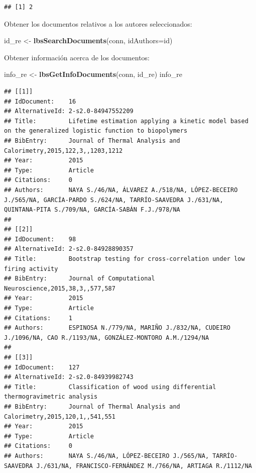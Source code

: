 \documentclass[
]{book}
\newenvironment{Shaded}{\begin{snugshade}}{\end{snugshade}}
\newcommand{\AttributeTok}[1]{\textcolor[rgb]{0.13,0.29,0.53}{#1}}
\newcommand{\FunctionTok}[1]{\textcolor[rgb]{0.13,0.29,0.53}{\textbf{#1}}}
\newcommand{\NormalTok}[1]{#1}
\newcommand{\OtherTok}[1]{\textcolor[rgb]{0.56,0.35,0.01}{#1}}
\begin{document}
\begin{verbatim}
## [1] 2
\end{verbatim}

Obtener los documentos relativos a los autores seleccionados:

\begin{Shaded}
\begin{Highlighting}[]
\NormalTok{id\_re  }\OtherTok{\textless{}{-}}  \FunctionTok{lbsSearchDocuments}\NormalTok{(conn, }\AttributeTok{idAuthors=}\NormalTok{id)}
\end{Highlighting}
\end{Shaded}

Obtener información acerca de los documentos:

\begin{Shaded}
\begin{Highlighting}[]
\NormalTok{info\_re }\OtherTok{\textless{}{-}} \FunctionTok{lbsGetInfoDocuments}\NormalTok{(conn, id\_re)}
\NormalTok{info\_re}
\end{Highlighting}
\end{Shaded}

\begin{verbatim}
## [[1]]
## IdDocument:    16
## AlternativeId: 2-s2.0-84947552209
## Title:         Lifetime estimation applying a kinetic model based on the generalized logistic function to biopolymers
## BibEntry:      Journal of Thermal Analysis and Calorimetry,2015,122,3,,1203,1212
## Year:          2015
## Type:          Article
## Citations:     0
## Authors:       NAYA S./46/NA, ÁLVAREZ A./518/NA, LÓPEZ-BECEIRO J./565/NA, GARCÍA-PARDO S./624/NA, TARRÍO-SAAVEDRA J./631/NA, QUINTANA-PITA S./709/NA, GARCÍA-SABÁN F.J./978/NA
## 
## [[2]]
## IdDocument:    98
## AlternativeId: 2-s2.0-84928890357
## Title:         Bootstrap testing for cross-correlation under low firing activity
## BibEntry:      Journal of Computational Neuroscience,2015,38,3,,577,587
## Year:          2015
## Type:          Article
## Citations:     1
## Authors:       ESPINOSA N./779/NA, MARIÑO J./832/NA, CUDEIRO J./1096/NA, CAO R./1193/NA, GONZÁLEZ-MONTORO A.M./1294/NA
## 
## [[3]]
## IdDocument:    127
## AlternativeId: 2-s2.0-84939982743
## Title:         Classification of wood using differential thermogravimetric analysis
## BibEntry:      Journal of Thermal Analysis and Calorimetry,2015,120,1,,541,551
## Year:          2015
## Type:          Article
## Citations:     0
## Authors:       NAYA S./46/NA, LÓPEZ-BECEIRO J./565/NA, TARRÍO-SAAVEDRA J./631/NA, FRANCISCO-FERNÁNDEZ M./766/NA, ARTIAGA R./1112/NA
\end{verbatim}
\end{document}
